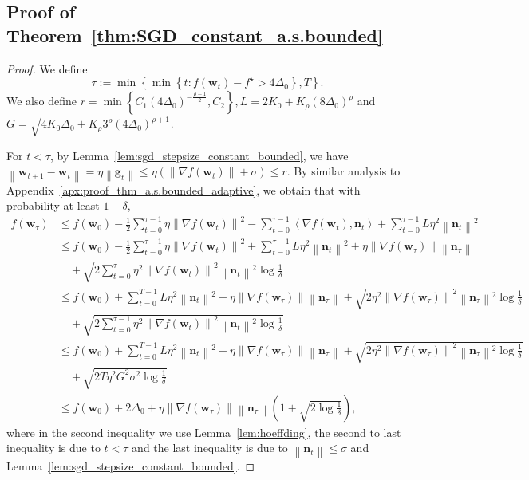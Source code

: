 \documentclass{article}
\newcommand{\Norm}[1]{\left\|#1\right\|}
\newcommand{\dotprod}[2]{\left\langle#1,#2\right\rangle}
\newcommand{\Kr}{K_{\rho}}
\newcommand{\paren}[1]{\left( #1 \right)}
\newcommand{\bw}{\mathbf{w}}
\newcommand{\bn}{\mathbf{n}}
\newcommand{\bg}{\mathbf{g}}
\begin{document}
\subsection{Proof of Theorem~\ref{thm:SGD_constant_a.s.bounded}}
\begin{proof}
    We define $$\tau:=\min\left\{\min\left\{t:f(\bw_t)-f^\star>4\Delta_0\right\}, T\right\}.$$ 
    We also define $r=\min\left\{C_1\paren{4\Delta_0}^{-\frac{\rho-1}{2}},C_2\right\}, L=2K_0+\Kr\paren{8\Delta_0}^\rho$ and $G=\sqrt{4K_0\Delta_0+\Kr3^\rho\paren{4\Delta_0}^{\rho+1}}$.

    For $t<\tau$, by Lemma~\ref{lem:sgd_stepsize_constant_bounded}, we have $\Norm{\bw_{t+1}-\bw_t}=\eta\Norm{\bg_t}\leq\eta\paren{\Norm{\nabla f(\bw_t)}+\sigma}\leq r$. By similar analysis to Appendix~\ref{apx:proof_thm_a.s.bounded_adaptive}, we obtain that with probability at least $1-\delta$,
    \begin{equation}\label{eq:sgd_stoppingtime_sum_constant}
        \begin{aligned}
            f(\bw_\tau)&\leq f(\bw_0)-\frac{1}{2}\sum_{t=0}^{\tau-1}\eta\Norm{\nabla f(\bw_t)}^2-\sum_{t=0}^{\tau-1}\dotprod{\nabla f(\bw_t)}{\bn_t}+\sum_{t=0}^{\tau-1}L\eta^2\Norm{\bn_t}^2\\
            &\leq f(\bw_0)-\frac{1}{2}\sum_{t=0}^{\tau-1}\eta\Norm{\nabla f(\bw_t)}^2+\sum_{t=0}^{\tau-1}L\eta^2\Norm{\bn_t}^2+ \eta\Norm{\nabla f(\bw_\tau)}\Norm{\bn_\tau}\\
            &\quad +\sqrt{2\sum_{t=0}^{\tau}\eta^2\Norm{\nabla f(\bw_t)}^2\Norm{\bn_t}^2\log\frac{1}{\delta}}\\
            &\leq f(\bw_0)+\sum_{t=0}^{T-1}L\eta^2\Norm{\bn_t}^2+\eta\Norm{\nabla f(\bw_\tau)}\Norm{\bn_\tau}+\sqrt{2\eta^2\Norm{\nabla f(\bw_\tau)}^2\Norm{\bn_\tau}^2\log\frac{1}{\delta}}\\
            &\quad+\sqrt{2\sum_{t=0}^{\tau-1}\eta^2\Norm{\nabla f(\bw_t)}^2\Norm{\bn_t}^2\log\frac{1}{\delta}}\\
            &\leq f(\bw_0)+\sum_{t=0}^{T-1}L\eta^2\Norm{\bn_t}^2+\eta\Norm{\nabla f(\bw_\tau)}\Norm{\bn_\tau}+\sqrt{2\eta^2\Norm{\nabla f(\bw_\tau)}^2\Norm{\bn_\tau}^2\log\frac{1}{\delta}}\\
            &\quad+\sqrt{2T\eta^2G^2\sigma^2\log\frac{1}{\delta}}\\
            &\leq f(\bw_0)+2\Delta_0+\eta\Norm{\nabla f(\bw_\tau)}\Norm{\bn_\tau}\paren{1+\sqrt{2\log\frac{1}{\delta}}},
        \end{aligned}
    \end{equation}
    where in the second inequality we use Lemma~\ref{lem:hoeffding}, 
    the second to last inequality is due to $t<\tau$
    and 
    the last inequality is due to $\Norm{\bn_t}\leq \sigma$ and  Lemma~\ref{lem:sgd_stepsize_constant_bounded}.


\end{proof}
\end{document}
